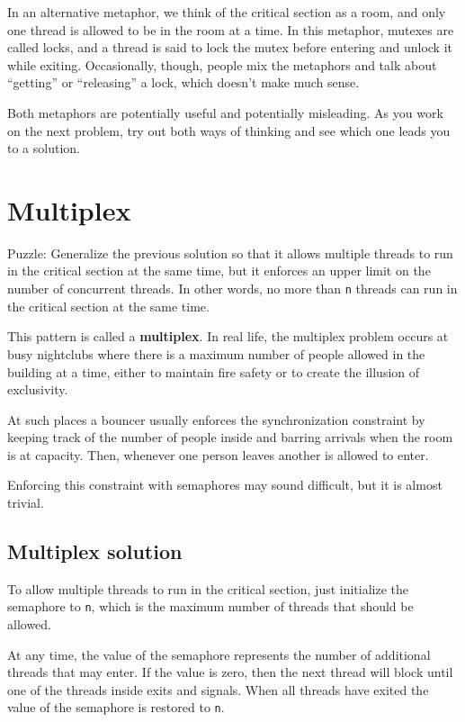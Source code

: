 \documentclass{book}
\newcommand{\clearemptydoublepage}{\newpage\cleardoublepage}
\begin{document}
In an alternative
metaphor, we think of the critical section as a room, and
only one thread is allowed to be in the room at a time.
In this metaphor, mutexes are called locks, and a thread
is said to lock the mutex before entering and unlock it while
exiting.  Occasionally, though, people mix the metaphors and
talk about ``getting'' or ``releasing'' a lock, which doesn't
make much sense.

Both metaphors are potentially useful and potentially misleading.
As you work on the next problem, try out both ways of thinking
and see which one leads you to a solution.


\section{Multiplex}

Puzzle: Generalize the previous solution so that it allows multiple
threads to run in the critical section at the same time, but it
enforces an upper limit on the number of concurrent threads.  In other
words, no more than {\tt n} threads can run in the critical section at
the same time.

This pattern is called a {\bf multiplex}.  In real life, the multiplex
problem occurs at busy nightclubs where there is a maximum number of
people allowed in the building at a time, either to maintain fire
safety or to create the illusion of exclusivity.

At such places a bouncer usually enforces the synchronization
constraint by keeping track of the number of people inside
and barring arrivals when the room is at capacity.  Then,
whenever one person leaves another is allowed to enter.

Enforcing this constraint with semaphores may sound difficult, but it
is almost trivial.


\clearemptydoublepage
\subsection{Multiplex solution}

To allow multiple threads to run in the critical section, just
initialize the semaphore to {\tt n}, which is the maximum number
of threads that should be allowed.

At any time, the value of the semaphore represents the
number of additional threads that may enter.  If the value is zero,
then the next thread will block until one of the threads inside
exits and signals.  When all threads have exited the value of the
semaphore is restored to {\tt n}.
\end{document}
